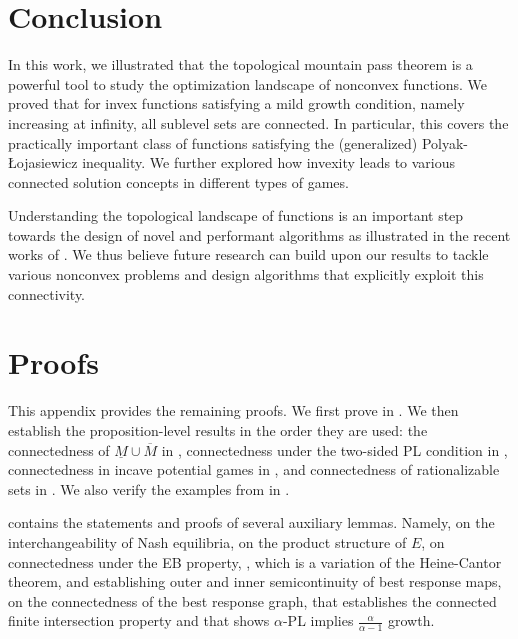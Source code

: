 \documentclass{article}
\begin{document}
\section{Conclusion}
In this work, we illustrated that the topological mountain pass theorem is a powerful tool to study the optimization landscape of nonconvex functions. We proved that for invex functions satisfying a mild growth condition, namely increasing at infinity, all sublevel sets are connected. In particular, this covers the practically important class of functions satisfying the (generalized) Polyak-\L{}ojasiewicz inequality. We further explored how invexity leads to various connected solution concepts in different types of games.

Understanding the topological landscape of functions is an important step towards the design of novel and performant algorithms as illustrated in the recent works of \citet{Masiha2025Superquantile,Gong2025Poincare}. We thus believe future research can build upon our results to tackle various nonconvex problems and design algorithms that explicitly exploit this connectivity.




\newpage







\newpage 
\appendix


\section{Proofs}
\label{app:proofs}

This appendix provides the remaining proofs. We first prove  in . We then establish the proposition-level results in the order they are used: the connectedness of $\underline{M}\cup \overline{M}$ in , connectedness under the two-sided PL condition in , connectedness in incave potential games in , and connectedness of rationalizable sets in . We also verify the examples from  in .

 contains the statements and proofs of several auxiliary lemmas. Namely,  on the interchangeability of Nash equilibria,  on the product structure of $E$,  on connectedness under the EB property, , which is a variation of the Heine-Cantor theorem,  and  establishing outer and inner semicontinuity of best response maps,  on the connectedness of the best response graph,  that establishes the connected finite intersection property and  that shows $\alpha$-PL implies $\frac{\alpha}{\alpha-1}$ growth.
\end{document}
